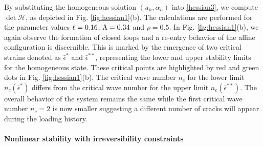 \documentclass[10pt]{article}
\begin{document}
By substituting the homogeneous solution {$(u_h, \alpha_h)$} into \eqref{hessian3}, we compute $\det \mathcal{H}$, as depicted  in Fig. \ref{fig:hessian1}(b). The calculations are performed for the parameter values $\ell=0.16$, $\Lambda=0.34$ and $\rho=0.5$.  In Fig. \ref{fig:hessian1}(b), we again observe the formation of closed loops and a re-entry behavior of the affine configuration is discernible. This is marked by the emergence of two critical strains denoted as $\bar\epsilon^*$ and $\bar\epsilon^{**}$, representing the lower and upper stability limits for the homogeneous state. These critical points are highlighted by red and green dots in Fig. \ref{fig:hessian1}(b). The critical wave number $n_c$ for the lower limit $n_c(\bar{\epsilon}^*)$    differs from the critical wave number for the upper limit $n_c(\bar{\epsilon}^{**})$. The overall behavior of the system remains the same while the first critical wave number $n_c=2$ is now smaller suggesting a different number of cracks will appear during the loading history.




%

\paragraph{Nonlinear stability with irreversibility constraints}
\end{document}
